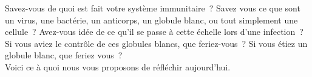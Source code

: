 Savez-vous de quoi est fait votre système immunitaire~? Savez vous ce
que sont un virus, une bactérie, un anticorps, un globule blanc, ou
tout simplement une cellule~? Avez-vous idée de ce qu'il se passe à
cette échelle lors d'une infection~? Si vous aviez le contrôle de ces
globules blancs, que feriez-vous~? Si vous étiez un globule blanc, que
feriez vous~?\\

Voici ce à quoi nous vous proposons de réfléchir aujourd'hui.
